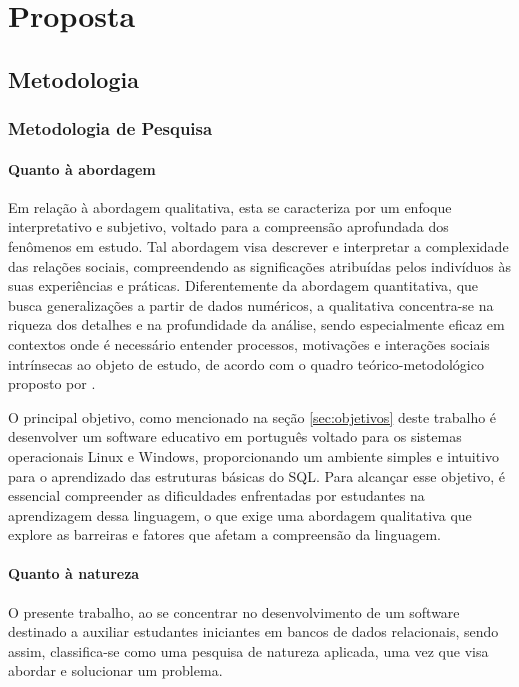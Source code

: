 \chapter[Proposta]{Proposta}
\label{sec:proposta}

\section{Metodologia}
\label{sec:metodologia}

\subsection{Metodologia de Pesquisa}

\subsubsection{Quanto à abordagem}

Em relação à abordagem qualitativa, esta se caracteriza por um enfoque interpretativo e subjetivo, voltado para a compreensão aprofundada dos fenômenos em estudo. Tal abordagem visa descrever e interpretar a complexidade das relações sociais, compreendendo as significações atribuídas pelos indivíduos às suas experiências e práticas. Diferentemente da abordagem quantitativa, que busca generalizações a partir de dados numéricos, a qualitativa concentra-se na riqueza dos detalhes e na profundidade da análise, sendo especialmente eficaz em contextos onde é necessário entender processos, motivações e interações sociais intrínsecas ao objeto de estudo, de acordo com o quadro teórico-metodológico proposto por \cite{Gerhardt2009}.

O principal objetivo, como mencionado na seção \ref{sec:objetivos} deste trabalho é desenvolver um software educativo em português voltado para os sistemas operacionais Linux e Windows, proporcionando um ambiente simples e intuitivo para o aprendizado das estruturas básicas do SQL. Para alcançar esse objetivo, é essencial compreender as dificuldades enfrentadas por estudantes na aprendizagem dessa linguagem, o que exige uma abordagem qualitativa que explore as barreiras e fatores que afetam a compreensão da linguagem.

\subsubsection{Quanto à natureza}

O presente trabalho, ao se concentrar no desenvolvimento de um software destinado a auxiliar estudantes iniciantes em bancos de dados relacionais, sendo assim, classifica-se como uma pesquisa de natureza aplicada, uma vez que visa abordar e solucionar um problema.\cite{Gerhardt2009} 


